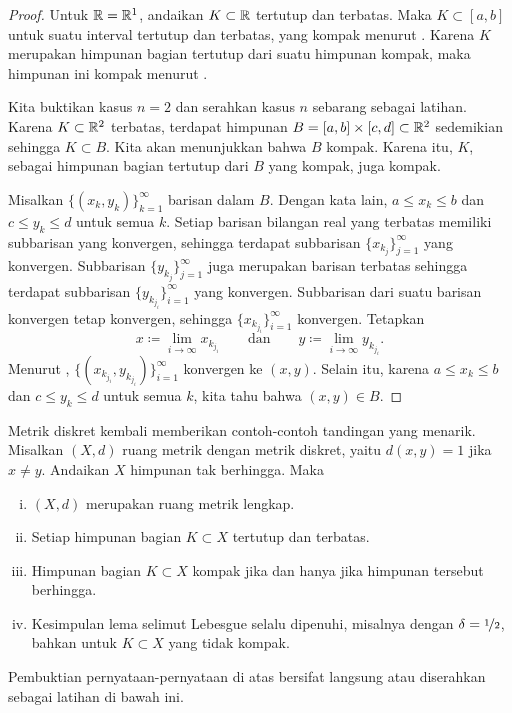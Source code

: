 \begin{proof}
Untuk ${\mathbb{R}} = {\mathbb{R}}^1$, andaikan $K \subset {\mathbb{R}}$ tertutup dan terbatas.
Maka $K \subset [a,b]$ untuk suatu interval tertutup dan terbatas,
yang kompak menurut .
Karena $K$ merupakan himpunan bagian tertutup dari suatu himpunan kompak,
maka himpunan ini kompak menurut .

Kita buktikan kasus $n=2$ dan serahkan kasus $n$ sebarang sebagai latihan.
Karena $K \subset {\mathbb{R}}^2$ terbatas, terdapat himpunan
$B=[a,b]\times[c,d] \subset {\mathbb{R}}^2$ sedemikian sehingga $K \subset B$.  Kita akan menunjukkan
bahwa $B$ kompak.  Karena itu, $K$, sebagai himpunan bagian tertutup dari $B$ yang kompak,
juga kompak.  

Misalkan $\bigl\{ (x_k,y_k) \bigr\}_{k=1}^\infty$ barisan dalam $B$.  Dengan kata lain,
$a \leq x_k \leq b$ dan
$c \leq y_k \leq d$ untuk semua $k$.  Setiap barisan bilangan real yang terbatas
memiliki subbarisan
yang konvergen, sehingga terdapat subbarisan $\{ x_{k_j} \}_{j=1}^\infty$
yang konvergen.  Subbarisan 
$\{ y_{k_j} \}_{j=1}^\infty$ juga merupakan barisan terbatas sehingga terdapat
subbarisan
$\{ y_{k_{j_i}} \}_{i=1}^\infty$ yang konvergen.  Subbarisan dari suatu
barisan konvergen tetap konvergen, sehingga 
$\{ x_{k_{j_i}} \}_{i=1}^\infty$ konvergen.
Tetapkan
\begin{equation*}
x \coloneqq \lim_{i\to\infty} x_{k_{j_i}}
\qquad \text{dan} \qquad
y \coloneqq \lim_{i\to\infty} y_{k_{j_i}} .
\end{equation*}
Menurut ,
$\bigl\{ (x_{k_{j_i}},y_{k_{j_i}}) \bigr\}_{i=1}^\infty$ konvergen ke $(x,y)$.
Selain itu, karena $a \leq x_k \leq b$ dan
$c \leq y_k \leq d$ untuk semua $k$, kita tahu bahwa $(x,y) \in B$.
\end{proof}

\begin{example}
Metrik diskret kembali memberikan contoh-contoh tandingan yang menarik.
Misalkan $(X,d)$ ruang metrik dengan metrik diskret, yaitu $d(x,y) = 1$
jika $x \neq y$.  Andaikan
$X$ himpunan tak berhingga.  Maka
\begin{enumerate}[(i)]
\item $(X,d)$ merupakan ruang metrik lengkap.
\item Setiap himpunan bagian $K \subset X$ tertutup dan terbatas.
\item Himpunan bagian $K \subset X$ kompak jika dan hanya jika himpunan tersebut berhingga.
\item Kesimpulan lema selimut Lebesgue selalu dipenuhi,
misalnya dengan $\delta = \nicefrac{1}{2}$,
bahkan untuk $K \subset X$ yang tidak kompak.
\end{enumerate}
Pembuktian
pernyataan-pernyataan di atas bersifat langsung atau diserahkan sebagai latihan
di bawah ini.
\end{example}


